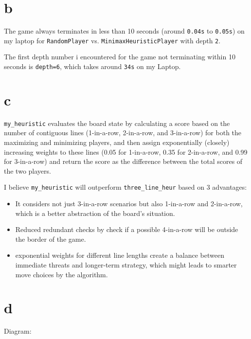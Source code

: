 \documentclass[12pt]{article}
\begin{document}
\newpage
\subsection{} 
\begin{enumerate}
	
\part{b} 
	
	The game always terminates in less than 10 seconds (around \texttt{0.04s} to \texttt{0.05s}) on my laptop for \texttt{RandomPlayer} vs. \texttt{MinimaxHeuristicPlayer} with depth \texttt{2}.
	
	The first depth number i encountered for the game not terminating within 10 seconds is \texttt{depth=6}, which takes around \texttt{34s} on my Laptop.

\part{c} 
	
	\texttt{my\_heuristic} evaluates the board state by calculating a score based on the number of contiguous lines (1-in-a-row, 2-in-a-row, and 3-in-a-row) for both the maximizing and minimizing players, and then assign exponentially (closely) increasing weights to these lines (0.05 for 1-in-a-row, 0.35 for 2-in-a-row, and 0.99 for 3-in-a-row) and return the score as the difference between the total scores of the two players.
	
	I believe \texttt{my\_heuristic} will outperform \texttt{three\_line\_heur} based on 3 advantages:
	\begin{itemize}
		\item It considers not just 3-in-a-row scenarios but also 1-in-a-row and 2-in-a-row, which is a better abstraction of the board's situation.
		\item Reduced redundant checks by check if a possible 4-in-a-row will be outside the border of the game.
		\item exponential weights for different line lengths create a balance between immediate threats and longer-term strategy, which might leads to smarter move choices by the algorithm.
		
	\end{itemize}

\part{d} Diagram:


\end{enumerate}
\end{document}
